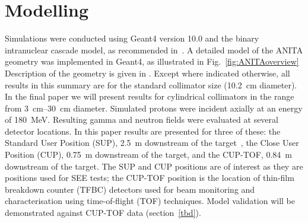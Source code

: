 \documentclass[11pt,a4paper]{IEEEtran}
\begin{document}
\section{Modelling}
Simulations were conducted using Geant4 version 10.0 and the binary intranuclear cascade model, as recommended in~\cite{Platt13}.
A detailed model of the ANITA geometry was implemented in Geant4, as illustrated in Fig.~\ref{fig:ANITAoverview}
Description of the geometry is given in \cite{Prokofiev2009,Prokofiev14}.
Except where indicated otherwise, all results in this summary are for the standard collimator size (\SI{10.2}{\cm} diameter).
In the final paper we will present results for cylindrical collimators in the range from \SIrange{3}{30}{\cm} diameter.
Simulated protons were incident axially at an energy of \SI{180}{\MeV}.
Resulting gamma and neutron fields were evaluated at several detector locations.
In this paper results are presented for three of these: the Standard User Position (SUP), \SI{2.5}{\m} downstream of the target~\cite{Prokofiev2009}, the Close User Position (CUP), \SI{0.75}{\m} downstream of the target, and the CUP-TOF, \SI{0.84}{m} downstream of the target.
The SUP and CUP positions are of interest as they are positions used for SEE tests; the CUP-TOF position is the location of thin-film breakdown counter (TFBC) detectors used for beam monitoring and characterisation using time-of-flight (TOF) techniques.
Model validation will be demonstrated against CUP-TOF data (section~\ref{tbd}).
\end{document}
